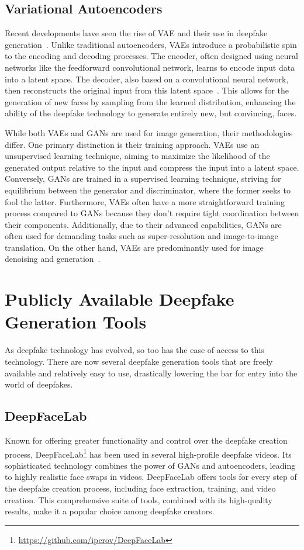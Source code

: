 \subsection{Variational Autoencoders}
Recent developments have seen the rise of \ac{VAE} and their use in deepfake
generation~\cite{kingma2022autoencoding}. Unlike traditional autoencoders, \ac{VAE}s introduce
a probabilistic spin to the encoding and decoding processes. The encoder, often
designed using neural networks like the feedforward convolutional network,
learns to encode input data into a latent space. The decoder, also based
on a convolutional neural network, then reconstructs the original input
from this latent space~\cite{vae-gan}. This allows for the
generation of new faces by sampling from the learned distribution, enhancing the
ability of the deepfake technology to generate entirely new, but convincing, faces.

While both \ac{VAE}s and \ac{GAN}s are used for image generation, their methodologies differ.
One primary distinction is their training approach. \ac{VAE}s use an unsupervised learning
technique, aiming to maximize the likelihood of the generated output relative to the
input and compress the input into a latent space. Conversely, \ac{GAN}s are trained
in a supervised learning technique, striving for equilibrium between the generator
and discriminator, where the former seeks to fool the latter. Furthermore, \ac{VAE}s
often have a more straightforward training process compared to \ac{GAN}s because they
don't require tight coordination between their components. Additionally, due to their
advanced capabilities, \ac{GAN}s are often used for demanding tasks such as
super-resolution and image-to-image translation. On the other hand, \ac{VAE}s are
predominantly used for image denoising and generation~\cite{vae-gan}.

\section{Publicly Available Deepfake Generation Tools}\label{chapter:publicly}
As deepfake technology has evolved, so too has the ease of access to this technology.
There are now several deepfake generation tools that are freely available and relatively
easy to use, drastically lowering the bar for entry into the world of deepfakes.

\subsection{DeepFaceLab}
Known for offering greater functionality and control over the deepfake creation
process, DeepFaceLab\footnote{\url{https://github.com/iperov/DeepFaceLab}}
has been used in several high-profile deepfake videos.
Its sophisticated technology combines the power of \ac{GAN}s and autoencoders,
leading to highly realistic face swaps in videos. DeepFaceLab offers tools
for every step of the deepfake creation process, including face extraction,
training, and video creation. This comprehensive suite of tools, combined
with its high-quality results, make it a popular choice among deepfake creators.

